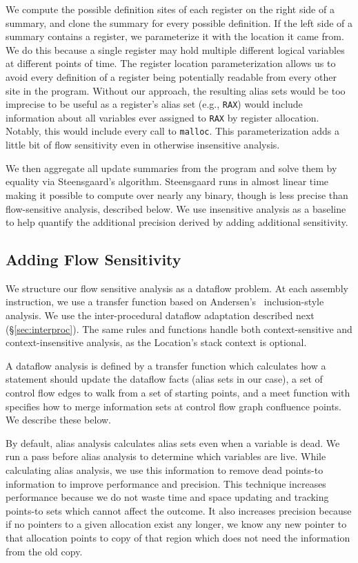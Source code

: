 We compute the possible definition sites of each register on the right side of a summary, and clone the summary for every possible definition.
If the left side of a summary contains a register, we parameterize it with the location it came from.
We do this because a single register may hold multiple different logical variables at different points of time.
The register location parameterization allows us to avoid every definition of a register being potentially readable from every other site in the program.
Without our approach, the resulting alias sets would be too imprecise to be useful as a register's alias set (e.g., \texttt{RAX}) would include information about all variables ever assigned to \texttt{RAX} by register allocation.
Notably, this would include every call to \texttt{malloc}.
This parameterization adds a little bit of flow sensitivity even in otherwise insensitive analysis.

We then aggregate all update summaries from the program and solve them by equality via Steensgaard's algorithm.
Steensgaard runs  in almost linear time~\cite{steensgaard-alias} making it possible to compute over nearly any binary, though is less precise than flow-sensitive analysis, described below.
We use insensitive analysis as a baseline to help quantify the additional precision derived by adding additional sensitivity.




\subsection{Adding Flow Sensitivity}
\label{alias:sec:dataflow}
We structure our flow sensitive analysis as a dataflow problem.
At each assembly instruction, we use a transfer function based on Andersen's~\cite{andersen} inclusion-style analysis.
We use the inter-procedural dataflow adaptation described next (\S\ref{sec:interproc}).
The same rules and functions handle both context-sensitive and context-insensitive analysis, as the Location's stack context is optional.

A dataflow analysis is defined by a transfer function which calculates how a statement should update the dataflow facts (alias sets in our case), a set of control flow edges to walk from a set of starting points, and a meet function with specifies how to merge information sets at control flow graph confluence points.
We describe these below.

By default, alias analysis calculates alias sets even when a variable is dead.
We run a pass before alias analysis to determine which variables are live.
While calculating alias analysis, we use this information to remove dead points-to information to improve performance and precision.
This technique increases performance because we do not waste time and space updating and tracking points-to sets which cannot affect the outcome.
It also increases precision because if no pointers to a given allocation exist any longer, we know any new pointer to that allocation points to copy of that region which does not need the information from the old copy.

